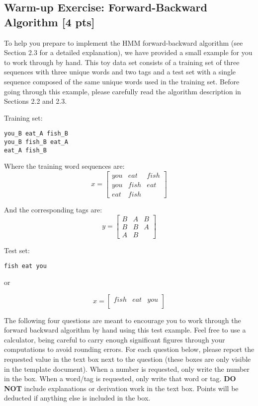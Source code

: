 \documentclass{article}
\begin{document}
\subsection{Warm-up Exercise: Forward-Backward Algorithm [4 pts]}\label{toy}
To help you prepare to implement the HMM forward-backward algorithm (see Section 2.3 for a detailed explanation), we have provided a small example for you to work through by hand. This toy data set consists of a training set of three sequences with three unique words and two tags and a test set with a single sequence composed of the same unique words used in the training set. Before going through this example, please carefully read the algorithm description in Sections 2.2 and 2.3.

Training set:
\begin{verbatim}
you_B eat_A fish_B
you_B fish_B eat_A
eat_A fish_B
\end{verbatim}

Where the training word sequences are:
$$
x= 
\begin{bmatrix}
you & eat & fish\\
you & fish & eat\\
eat & fish &
\end{bmatrix}
$$

And the corresponding tags are:
$$
y= 
\begin{bmatrix}
B & A & B\\
B & B & A\\
A & B &
\end{bmatrix}
$$


Test set:
\begin{verbatim}
fish eat you
\end{verbatim}

or 

$$
x= 
\begin{bmatrix}
fish & eat & you\\
\end{bmatrix}
$$

The following four questions are meant to encourage you to work through the forward backward algorithm by hand using this test example. Feel free to use a calculator, being careful to carry enough significant figures through your computations to avoid rounding errors. For each question below, please report the requested value in the text box next to the question (these boxes are only visible in the template document). When a number is requested, only write the number in the box. When a word/tag is requested, only write that word or tag. \textbf{DO NOT} include explanations or derivation work in the text box. Points will be deducted if anything else is included in the box.
\end{document}
